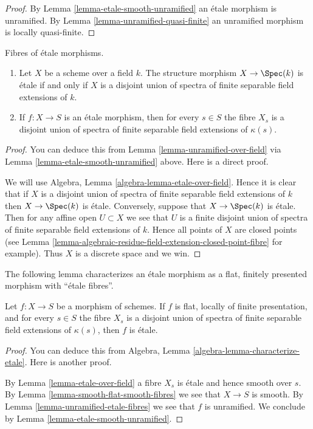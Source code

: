 \begin{proof}
By
Lemma \ref{lemma-etale-smooth-unramified}
an \'etale morphism is unramified. By
Lemma \ref{lemma-unramified-quasi-finite}
an unramified morphism is locally quasi-finite.
\end{proof}

\begin{lemma}
\label{lemma-etale-over-field}
Fibres of \'etale morphisms.
\begin{enumerate}
\item Let $X$ be a scheme over a field $k$.
The structure morphism $X \to \Spec(k)$ is \'etale if
and only if $X$ is a disjoint union of spectra of finite separable
field extensions of $k$.
\item If $f : X \to S$ is an \'etale morphism, then for every $s \in S$ the
fibre $X_s$ is a disjoint union of spectra of finite separable field
extensions of $\kappa(s)$.
\end{enumerate}
\end{lemma}

\begin{proof}
You can deduce this from Lemma \ref{lemma-unramified-over-field}
via Lemma \ref{lemma-etale-smooth-unramified} above.
Here is a direct proof.

\medskip\noindent
We will use Algebra, Lemma \ref{algebra-lemma-etale-over-field}.
Hence it is clear that if $X$ is a disjoint union of spectra of finite
separable field extensions of $k$ then $X \to \Spec(k)$ is \'etale.
Conversely, suppose that $X \to \Spec(k)$ is \'etale. Then for any affine
open $U \subset X$ we see that $U$ is a finite disjoint union of spectra
of finite separable field extensions of $k$. Hence all points of $X$
are closed points (see
Lemma \ref{lemma-algebraic-residue-field-extension-closed-point-fibre}
for example). Thus $X$ is a discrete space and we win.
\end{proof}

\noindent
The following lemma characterizes an \'etale morphism as a
flat, finitely presented morphism with ``\'etale fibres''.

\begin{lemma}
\label{lemma-etale-flat-etale-fibres}
Let $f : X \to S$ be a morphism of schemes.
If $f$ is flat, locally of finite presentation, and for every $s \in S$
the fibre $X_s$ is a disjoint union of spectra of finite separable
field extensions of $\kappa(s)$, then $f$ is \'etale.
\end{lemma}

\begin{proof}
You can deduce this from
Algebra, Lemma \ref{algebra-lemma-characterize-etale}.
Here is another proof.

\medskip\noindent
By Lemma \ref{lemma-etale-over-field} a fibre $X_s$ is \'etale
and hence smooth over $s$. By Lemma \ref{lemma-smooth-flat-smooth-fibres}
we see that $X \to S$ is smooth.
By Lemma \ref{lemma-unramified-etale-fibres}
we see that $f$ is unramified. We conclude by
Lemma \ref{lemma-etale-smooth-unramified}.
\end{proof}

